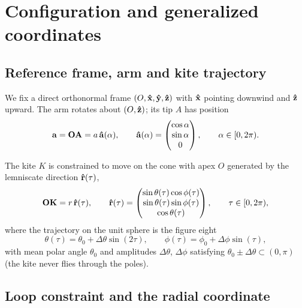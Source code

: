 \documentclass[10pt, a4paper]{article}
\begin{document}
\section{Configuration and generalized coordinates}
\label{sec:configuration}

\subsection{Reference frame, arm and kite trajectory}

We fix a direct orthonormal frame $(O, \vu x, \vu y, \vu z)$ with $\vu x$
pointing downwind and $\vu z$ upward.  The arm rotates about $(O, \vu z)$;
its tip $A$ has position
\begin{equation}
    \vb a = \vb{OA} = a\,\vu a(\alpha),
    \qquad
    \vu a(\alpha) = \begin{pmatrix} \cos\alpha \\ \sin\alpha \\ 0 \end{pmatrix},
    \qquad \alpha \in [0, 2\pi).
\end{equation}

The kite $K$ is constrained to move on the cone with apex $O$ generated by
the lemniscate direction $\vu r(\tau)$,
\begin{equation}
    \vb{OK} = r\,\vu r(\tau),
    \qquad
    \vu r(\tau) = \begin{pmatrix}
        \sin\theta(\tau)\cos\phi(\tau) \\
        \sin\theta(\tau)\sin\phi(\tau) \\
        \cos\theta(\tau)
    \end{pmatrix},
    \qquad \tau \in [0, 2\pi),
\end{equation}
where the trajectory on the unit sphere is the figure eight
\begin{equation} \label{eq:lemniscate}
    \theta(\tau) = \theta_0 + \Delta\theta \sin(2\tau),
    \qquad
    \phi(\tau) = \phi_0 + \Delta\phi \sin(\tau),
\end{equation}
with mean polar angle $\theta_0$ and amplitudes $\Delta\theta$, $\Delta\phi$
satisfying $\theta_0 \pm \Delta\theta \subset (0, \pi)$ (the kite never flies
through the poles).

\subsection{Loop constraint and the radial coordinate}
\end{document}
